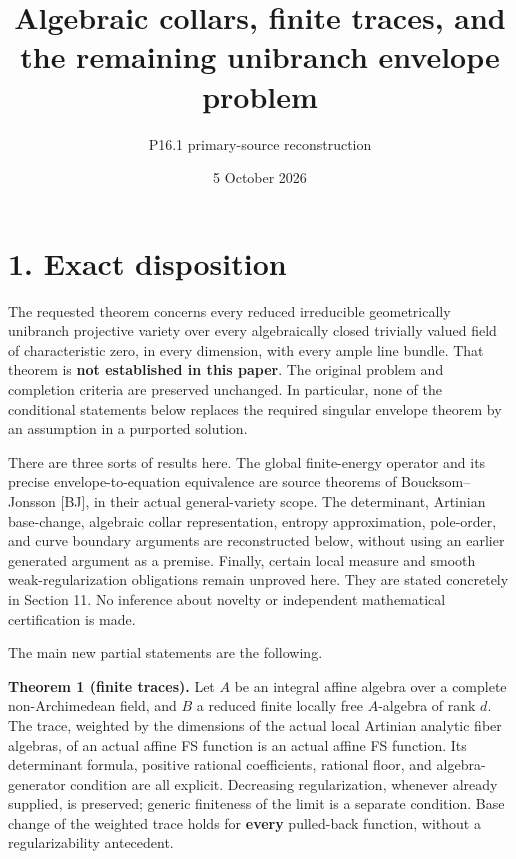 \documentclass[
  10pt,
]{article}
\title{Algebraic collars, finite traces, and the remaining unibranch
envelope problem}
\author{P16.1 primary-source reconstruction}
\date{5 October 2026}
\begin{document}
\maketitle

\section{1. Exact disposition}\label{exact-disposition}

The requested theorem concerns every reduced irreducible geometrically
unibranch projective variety over every algebraically closed trivially
valued field of characteristic zero, in every dimension, with every
ample line bundle. That theorem is \textbf{not established in this
paper}. The original problem and completion criteria are preserved
unchanged. In particular, none of the conditional statements below
replaces the required singular envelope theorem by an assumption in a
purported solution.

There are three sorts of results here. The global finite-energy operator
and its precise envelope-to-equation equivalence are source theorems of
Boucksom--Jonsson {[}BJ{]}, in their actual general-variety scope. The
determinant, Artinian base-change, algebraic collar representation,
entropy approximation, pole-order, and curve boundary arguments are
reconstructed below, without using an earlier generated argument as a
premise. Finally, certain local measure and smooth weak-regularization
obligations remain unproved here. They are stated concretely in Section
11. No inference about novelty or independent mathematical certification
is made.

The main new partial statements are the following.

\textbf{Theorem 1 (finite traces).} Let \(A\) be an integral affine
algebra over a complete non-Archimedean field, and \(B\) a reduced
finite locally free \(A\)-algebra of rank \(d\). The trace, weighted by
the dimensions of the actual local Artinian analytic fiber algebras, of
an actual affine FS function is an actual affine FS function. Its
determinant formula, positive rational coefficients, rational floor, and
algebra-generator condition are all explicit. Decreasing regularization,
whenever already supplied, is preserved; generic finiteness of the limit
is a separate condition. Base change of the weighted trace holds for
\textbf{every} pulled-back function, without a regularizability
antecedent.
\end{document}
